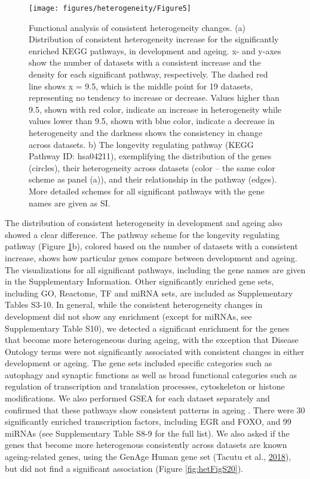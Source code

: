 \documentclass[12pt,twoside]{unicam}
\begin{document}
\begin{figure}

{\centering \texttt{[image: figures/heterogeneity/Figure5]} 

}

\caption[Functional analysis of consistent heterogeneity changes]{Functional analysis of consistent heterogeneity changes. (a) Distribution of consistent heterogeneity increase for the significantly enriched KEGG pathways, in development and ageing. x- and y-axes show the number of datasets with a consistent increase and the density for each significant pathway, respectively. The dashed red line shows x = 9.5, which is the middle point for 19 datasets, representing no tendency to increase or decrease. Values higher than 9.5, shown with red color, indicate an increase in heterogeneity while values lower than 9.5, shown with blue color, indicate a decrease in heterogeneity and the darkness shows the consistency in change across datasets. b) The longevity regulating pathway (KEGG Pathway ID: hsa04211), exemplifying the distribution of the genes (circles), their heterogeneity across datasets (color – the same color scheme as panel (a)), and their relationship in the pathway (edges). More detailed schemes for all significant pathways with the gene names are given as SI.  }\label{fig:hetFig5}
\end{figure}

The distribution of consistent heterogeneity in development and ageing also showed a clear difference. The pathway scheme for the longevity regulating pathway (Figure \ref{fig:hetFig5}b), colored based on the number of datasets with a consistent increase, shows how particular genes compare between development and ageing. The visualizations for all significant pathways, including the gene names are given in the Supplementary Information. Other significantly enriched gene sets, including GO, Reactome, TF and miRNA sets, are included as Supplementary Tables S3-10. In general, while the consistent heterogeneity changes in development did not show any enrichment (except for miRNAs, see Supplementary Table S10), we detected a significant enrichment for the genes that become more heterogeneous during ageing, with the exception that Disease Ontology terms were not significantly associated with consistent changes in either development or ageing. The gene sets included specific categories such as autophagy and synaptic functions as well as broad functional categories such as regulation of transcription and translation processes, cytoskeleton or histone modifications. We also performed GSEA for each dataset separately and confirmed that these pathways show consistent patterns in ageing
. There were 30 significantly enriched transcription factors, including EGR and FOXO, and 99 miRNAs (see Supplementary Table S8-9 for the full list). We also asked if the genes that become more heterogenous consistently across datasets are known ageing-related genes, using the GenAge Human gene set (Tacutu et al., \protect\hyperlink{ref-Tacutu2018}{2018}), but did not find a significant association (Figure \ref{fig:hetFigS20}).
\end{document}

